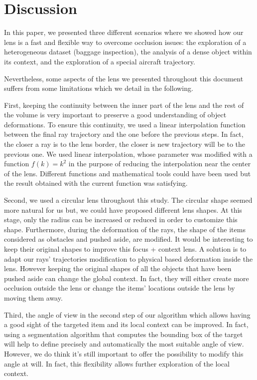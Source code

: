 \section{Discussion}
In this paper, we presented three different scenarios where we showed how our lens is a fast and flexible way to overcome occlusion issues: the exploration of a heterogeneous dataset (baggage inspection), the analysis of a dense object within its context, and the exploration of a special aircraft trajectory.    

Nevertheless, some aspects of the lens we presented throughout this document suffers from some limitations which we detail in the following. 


First, keeping the continuity between the inner part of the lens and the rest of the volume is very important to preserve a good understanding of object deformations. To ensure this continuity, we used a linear interpolation function between the final ray trajectory and the one before the previous steps. In fact, the closer a ray is to the lens border, the closer is new trajectory will be to the previous one. We used linear interpolation, whose parameter was modified with a function $ f\left(k\right) = k^2$ in the purpose of reducing the interpolation near the center of the lens. Different functions and mathematical tools could have been used but the result obtained with the current function was satisfying. 

Second, we used a circular lens throughout this study. The circular shape seemed more natural for us but, we could have proposed different lens shapes. At this stage, only the radius can be increased or reduced in order to customize this shape. Furthermore, during the deformation of the rays, the shape of the items considered as obstacles and pushed aside, are modified. It would be interesting to keep their original shapes to improve this focus + context lens. A solution is to adapt our rays' trajectories modification to physical based deformation inside the lens. However keeping the original shapes of all the objects that have been pushed aside can change the global context. In fact, they will either create more occlusion outside the lens or change the items' locations outside the lens by moving them away.  


Third, the angle of view in the second step of our algorithm which allows having a good sight of the targeted item and its local context can be improved. In fact, using a segmentation algorithm that computes the bounding box of the target will help to define precisely and automatically the most suitable angle of view. However, we do think it's still important to offer the possibility to modify this angle at will. In fact, this flexibility allows further exploration of the local context.

